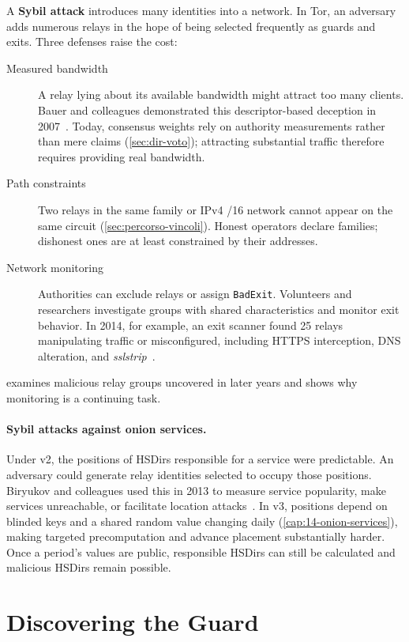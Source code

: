 A \textbf{Sybil attack} introduces many identities into a network. In Tor, an adversary adds numerous relays in the hope of being selected frequently as guards and exits. Three defenses raise the cost:
\begin{description}
  \item[Measured bandwidth] A relay lying about its available bandwidth might attract too many clients. Bauer and colleagues demonstrated this descriptor-based deception in 2007~\cite{bauer2007lowresource}. Today, consensus weights rely on authority measurements rather than mere claims (\cref{sec:dir-voto}); attracting substantial traffic therefore requires providing real bandwidth.
  \item[Path constraints] Two relays in the same family or IPv4 /16 network cannot appear on the same circuit (\cref{sec:percorso-vincoli}). Honest operators declare families; dishonest ones are at least constrained by their addresses.
  \item[Network monitoring] Authorities can exclude relays or assign \texttt{BadExit}. Volunteers and researchers investigate groups with shared characteristics and monitor exit behavior. In 2014, for example, an exit scanner found 25 relays manipulating traffic or misconfigured, including HTTPS interception, DNS alteration, and \emph{sslstrip}~\cite{winter2014spoiled}.
\end{description}
 examines malicious relay groups uncovered in later years and shows why monitoring is a continuing task.

\paragraph{Sybil attacks against onion services.} Under v2, the positions of HSDirs responsible for a service were predictable. An adversary could generate relay identities selected to occupy those positions. Biryukov and colleagues used this in 2013 to measure service popularity, make services unreachable, or facilitate location attacks~\cite{biryukov2013trawling}. In v3, positions depend on blinded keys and a shared random value changing daily (\cref{cap:14-onion-services}), making targeted precomputation and advance placement substantially harder. Once a period's values are public, responsible HSDirs can still be calculated and malicious HSDirs remain possible.

\section{Discovering the Guard}\label{sec:att-guard}

